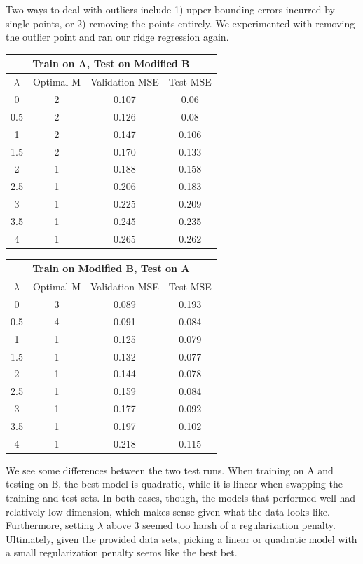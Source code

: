 \documentclass[8pt]{article}
\begin{document}
Two ways to deal with outliers include 1) upper-bounding errors incurred by single points, or 2) removing the points entirely. We experimented with removing the outlier point and ran our ridge regression again.

\begin{center}
 \begin{tabular}{||c c c c||} 
 \hline
 \multicolumn{4}{|c|}{Train on A, Test on Modified B} \\
 \hline
 \hline
 $\lambda$ & Optimal M & Validation MSE & Test MSE\\ [0.5ex] 
 \hline\hline
 0 & 2 & 0.107 & 0.06 \\ 
 \hline
 0.5 & 2 & 0.126 & 0.08 \\
 \hline
 1 & 2 & 0.147 & 0.106 \\
 \hline
 1.5 & 2 & 0.170 & 0.133 \\
 \hline
2 & 1 & 0.188 & 0.158 \\
 \hline
2.5 & 1 & 0.206 & 0.183 \\
 \hline
3 & 1 & 0.225 & 0.209 \\
 \hline
 3.5 & 1 & 0.245 & 0.235 \\
 \hline
4 & 1 & 0.265 & 0.262 \\
 \hline
\end{tabular}
\quad
 \begin{tabular}{||c c c c||} 
 \hline
 \multicolumn{4}{|c|}{Train on Modified B, Test on A} \\
 \hline
 \hline
 $\lambda$ & Optimal M & Validation MSE & Test MSE\\ [0.5ex] 
 \hline\hline
 0 & 3 & 0.089 & 0.193 \\ 
 \hline
 0.5 & 4 & 0.091 & 0.084 \\
 \hline
 1 & 1 & 0.125 & 0.079 \\
 \hline
 1.5 & 1 & 0.132 & 0.077 \\
 \hline
2 & 1 & 0.144 & 0.078 \\
 \hline
2.5 & 1 & 0.159 & 0.084 \\
 \hline
3 & 1 & 0.177 & 0.092 \\
 \hline
 3.5 & 1 & 0.197 & 0.102 \\
 \hline
4 & 1 & 0.218 & 0.115 \\
 \hline
\end{tabular}
\end{center}

We see some differences between the two test runs. When training on A and testing on B, the best model is quadratic, while it is linear when swapping the training and test sets. In both cases, though, the models that performed well had relatively low dimension, which makes sense given what the data looks like. Furthermore, setting $\lambda$ above 3 seemed too harsh of a regularization penalty. Ultimately, given the provided data sets, picking a linear or quadratic model with a small regularization penalty seems like the best bet.
\end{document}
